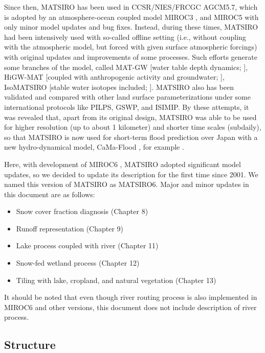 Since then, MATSIRO has been used in CCSR/NIES/FRCGC AGCM5.7, which is adopted by an atmosphere-ocean coupled model MIROC3 \citep{K-1_Model_Developers2004-lg}, and MIROC5 \citep{Watanabe2010-iv} with
only minor model updates and bug fixes. Instead, during these times, MATSIRO had been intensively used with so-called offline setting (i.e., without coupling with the atmospheric model, but forced
with given surface atmospheric forcings) with original updates and improvements of some processes. Such efforts generate some branches of the model, called MAT-GW {[}water table depth dynamics;
\citet{Koirala2014-lq}{]}, HiGW-MAT {[}coupled with anthropogenic activity and groundwater; \citet{Pokhrel2015-yk}{]}, IsoMATSIRO {[}stable water isotopes included; \citet{Yoshimura2006-ub}{]}.
MATSIRO also has been validated and compared with other land surface parameterizations under some international protocols like PILPS, GSWP, and ISIMIP. By these attempts, it was revealed that, apart
from its original design, MATSIRO was able to be used for higher resolution (up to about 1 kilometer) and shorter time scales (subdaily), so that MATSIRO is now used for short-term flood prediction
over Japan with a new hydro-dynamical model, CaMa-Flood \citep{Yamazaki2011-gu}, for example \citep{Ma2021-ey}.

Here, with development of MIROC6 \citep{Tatebe2019-ow}, MATSIRO adopted significant model updates, so we decided to update its description for the first time since 2001. We named this version of
MATSIRO as MATSIRO6. Major and minor updates in this document are as follows:

\begin{itemize}
\tightlist
\item
  Snow cover fraction diagnosis (Chapter 8)
\item
  Runoff representation (Chapter 9)
\item
  Lake process coupled with river (Chapter 11)
\item
  Snow-fed wetland process (Chapter 12)
\item
  Tiling with lake, cropland, and natural vegetation (Chapter 13)
\end{itemize}

It should be noted that even though river routing process is also implemented in MIROC6 and other versions, this document does not include description of river process.

\subsection{Structure}\label{structure}

